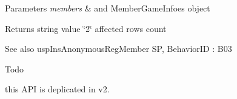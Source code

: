 \begin{DoxyParams}{Parameters}
{\em members} & and Member\+Game\+Infoes object \\
\hline
\end{DoxyParams}
\begin{DoxyReturn}{Returns}
string value \char`\"{}2\char`\"{} affected rows count 
\end{DoxyReturn}
\begin{DoxySeeAlso}{See also}
usp\+Ins\+Anonymous\+Reg\+Member SP, Behavior\+ID \+: B03 
\end{DoxySeeAlso}
\begin{DoxyRefDesc}{Todo}
\item[\hyperlink{a00001__todo000008}{Todo}]this A\+PI is deplicated in v2. \end{DoxyRefDesc}
